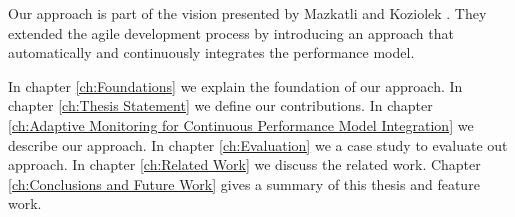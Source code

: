 Our approach is part of the vision presented by Mazkatli and Koziolek \cite{mazkatli2018continuous}. They extended the agile development process by introducing an approach that automatically and continuously integrates the performance model. 

In chapter \ref{ch:Foundations} we explain the foundation of our approach. In chapter \ref{ch:Thesis Statement} we define our contributions. In chapter \ref{ch:Adaptive Monitoring for Continuous Performance Model Integration} we describe our approach. In chapter \ref{ch:Evaluation} we a case study to evaluate out approach. In chapter \ref{ch:Related Work} we discuss the related work. Chapter \ref{ch:Conclusions and Future Work} gives a summary of this thesis and feature work. 

